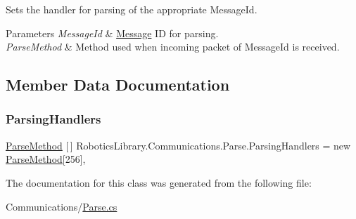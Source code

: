 Sets the handler for parsing of the appropriate Message\+Id. 


\begin{DoxyParams}{Parameters}
{\em Message\+Id} & \hyperlink{class_robotics_library_1_1_communications_1_1_message}{Message} ID for parsing.\\
\hline
{\em Parse\+Method} & Method used when incoming packet of {\ttfamily Message\+Id} is received.\\
\hline
\end{DoxyParams}


\subsection{Member Data Documentation}
\mbox{\label{class_robotics_library_1_1_communications_1_1_parse_aa2e45508e6d9222047bfbec487628c87}} 
\subsubsection{\texorpdfstring{Parsing\+Handlers}{ParsingHandlers}}
{\footnotesize\ttfamily \hyperlink{class_robotics_library_1_1_communications_1_1_parse_a592095b5638ced6eacabbce7acdb5e75}{Parse\+Method} \mbox{[}$\,$\mbox{]} Robotics\+Library.\+Communications.\+Parse.\+Parsing\+Handlers = new \hyperlink{class_robotics_library_1_1_communications_1_1_parse_a592095b5638ced6eacabbce7acdb5e75}{Parse\+Method}\mbox{[}256\mbox{]}\hspace{0.3cm}{\ttfamily [static]}, {\ttfamily [private]}}



The documentation for this class was generated from the following file\+:\begin{DoxyCompactItemize}
\item 
Communications/\hyperlink{_parse_8cs}{Parse.\+cs}\end{DoxyCompactItemize}

